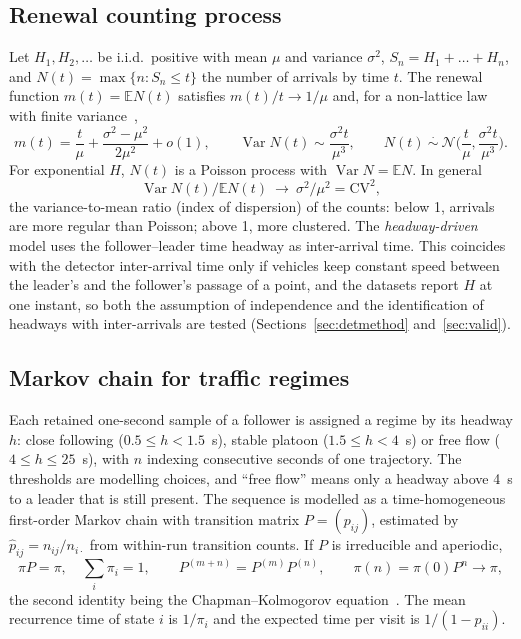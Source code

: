 \documentclass[10pt,a4paper]{article}
\numberwithin{equation}{section}
\newcommand{\E}{\mathbb{E}}
\newcommand{\Var}{\operatorname{Var}}
\begin{document}
\subsection{Renewal counting process}\label{sec:renewal}
Let $H_1,H_2,\dots$ be i.i.d.\ positive with mean $\mu$ and variance $\sigma^2$, $S_n=H_1+\dots+H_n$, and $N(t)=\max\{n:S_n\le t\}$ the number of arrivals by time $t$. The renewal function $m(t)=\E N(t)$ satisfies $m(t)/t\to1/\mu$ and, for a non-lattice law with finite variance~\cite{cox1962,ross1996},
\begin{equation}\label{eq:renewal}
m(t)=\frac t\mu+\frac{\sigma^2-\mu^2}{2\mu^2}+o(1),\qquad \Var N(t)\sim\frac{\sigma^2t}{\mu^3},\qquad N(t)\ \overset{\cdot}{\sim}\ \mathcal N\!\Big(\frac t\mu,\frac{\sigma^2t}{\mu^3}\Big).
\end{equation}
For exponential $H$, $N(t)$ is a Poisson process with $\Var N=\E N$. In general
\begin{equation}\label{eq:dispersion}
\Var N(t)/\E N(t)\ \longrightarrow\ \sigma^2/\mu^2=\mathrm{CV}^2,
\end{equation}
the variance-to-mean ratio (index of dispersion) of the counts: below 1, arrivals are more regular than Poisson; above 1, more clustered.
The \emph{headway-driven} model uses the follower--leader time headway as inter-arrival time. This coincides with the detector inter-arrival time only if vehicles keep constant speed between the leader's and the follower's passage of a point, and the datasets report $H$ at one instant, so both the assumption of independence and the identification of headways with inter-arrivals are tested (Sections~\ref{sec:detmethod} and~\ref{sec:valid}).

\subsection{Markov chain for traffic regimes}\label{sec:markov}
Each retained one-second sample of a follower is assigned a regime by its headway $h$: close following ($0.5\le h<1.5$~s), stable platoon ($1.5\le h<4$~s) or free flow ($4\le h\le25$~s), with $n$ indexing consecutive seconds of one trajectory.
The thresholds are modelling choices, and ``free flow'' means only a headway above 4~s to a leader that is still present. The sequence is modelled as a time-homogeneous first-order Markov chain with transition matrix $P=(p_{ij})$, estimated by $\hat p_{ij}=n_{ij}/n_{i\cdot}$ from within-run transition counts. If $P$ is irreducible and aperiodic,
\begin{equation}\label{eq:stationary}
\pi P=\pi,\quad\sum_i\pi_i=1,\qquad P^{(m+n)}=P^{(m)}P^{(n)},\qquad \pi(n)=\pi(0)P^n\to\pi,
\end{equation}
the second identity being the Chapman--Kolmogorov equation~\cite{norris1997}. The mean recurrence time of state $i$ is $1/\pi_i$ and the expected time per visit is $1/(1-p_{ii})$.
\end{document}
